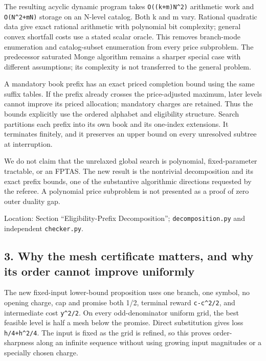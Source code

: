 \documentclass[11pt,letterpaper]{article}
\begin{document}
The resulting acyclic dynamic program takes \nolinkurl{O((k+m)N^2)} arithmetic work and \nolinkurl{O(N^2+mN)} storage on an N-level catalog. Both k and m vary. Rational quadratic data give exact rational arithmetic with polynomial bit complexity; general convex shortfall costs use a stated scalar oracle. This removes branch-mode enumeration and catalog-subset enumeration from every price subproblem. The predecessor saturated Monge algorithm remains a sharper special case with different assumptions; its complexity is not transferred to the general problem.



A mandatory book prefix has an exact priced completion bound using the same suffix tables. If the prefix already crosses the price-adjusted maximum, later levels cannot improve its priced allocation; mandatory charges are retained. Thus the bounds explicitly use the ordered alphabet and eligibility structure. Search partitions each prefix into its own book and its one-index extensions. It terminates finitely, and it preserves an upper bound on every unresolved subtree at interruption.



We do not claim that the unrelaxed global search is polynomial, fixed-parameter tractable, or an FPTAS. The new result is the nontrivial decomposition and its exact prefix bounds, one of the substantive algorithmic directions requested by the referee. A polynomial price subproblem is not presented as a proof of zero outer duality gap.



Location: Section “Eligibility-Prefix Decomposition”; \nolinkurl{decomposition.py} and independent \nolinkurl{checker.py}.



\subsection*{3. Why the mesh certificate matters, and why its order cannot improve uniformly}


The new fixed-input lower-bound proposition uses one branch, one symbol, no opening charge, cap and promise both 1/2, terminal reward \nolinkurl{c-c^2/2}, and intermediate cost \nolinkurl{y^2/2}. On every odd-denominator uniform grid, the best feasible level is half a mesh below the promise. Direct substitution gives loss \nolinkurl{h/4+h^2/4}. The input is fixed as the grid is refined, so this proves order-sharpness along an infinite sequence without using growing input magnitudes or a specially chosen charge.
\end{document}
